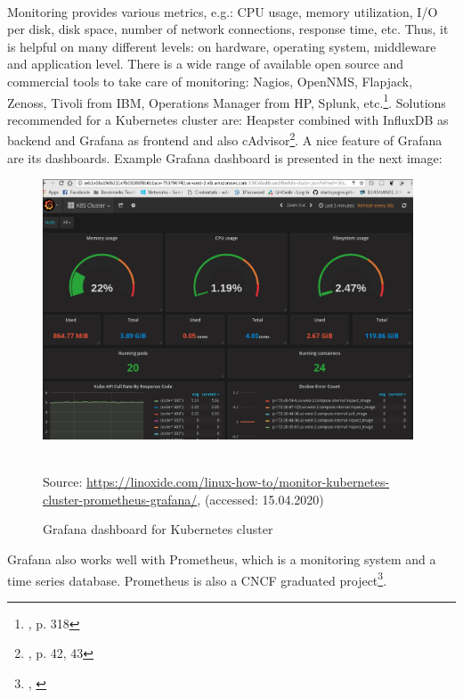 \paragraph{}
Monitoring provides various metrics, e.g.: CPU usage, memory utilization, I/O per disk, disk space, number of network connections, response time, etc. Thus, it is helpful on many different levels: on hardware, operating system,  middleware and application level. There is a wide range of available open source and commercial tools to take care of monitoring: Nagios, OpenNMS, Flapjack, Zenoss, Tivoli from IBM, Operations Manager from HP, Splunk, etc.\footnote{\cite{book-cicd}, p. 318}. Solutions recommended for a Kubernetes cluster are: Heapster combined with InfluxDB as backend and Grafana as frontend and also cAdvisor\footnote{\cite{book-mastering-k8s}, p. 42, 43}. A nice feature of Grafana are its dashboards. Example Grafana dashboard is presented in the next image:
\begin{figure}[H]
  \centering
  \includegraphics[width=11cm]{figures/grafana.png}
  \label{fig:grafana}
  \caption{Grafana dashboard for Kubernetes cluster}
  \\
  \small{Source: \url{https://linoxide.com/linux-how-to/monitor-kubernetes-cluster-prometheus-grafana/}, (accessed: 15.04.2020)}
\end{figure}
Grafana also works well with Prometheus, which is a monitoring system and a time series database. Prometheus is also a CNCF graduated project\footnote{\cite{online-prometheus-gh}, \cite{online-prometheus-www}}.

